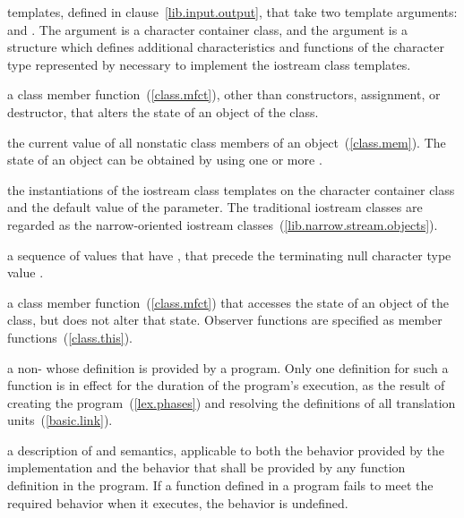 templates, defined in clause~\ref{lib.input.output},
that take two template arguments:  and .
The argument
is a character container class,
and the argument
is a structure which defines additional characteristics and functions
of the character type represented by
necessary to implement the iostream class templates.

%
a class member function~(\ref{class.mfct}), other than constructors,
assignment, or destructor,
that alters the state of an object of the class.

%
the current value of all nonstatic class members of an object~(\ref{class.mem}).
The state of an object can be obtained by using one or more
.

the instantiations of the iostream class templates on the character container
class  and the default value of the  parameter.
The traditional iostream classes are regarded as the narrow-oriented
iostream classes~(\ref{lib.narrow.stream.objects}).

%
%
a sequence of values that have
,
that precede the terminating null character type
value
.

%
a class member function~(\ref{class.mfct}) that accesses the state of an object of the class,
but does not alter that state.
Observer functions are specified as
member functions~(\ref{class.this}).

%
a non-
whose definition is provided by a \Cpp program.
Only one definition for such a function is in effect for the duration of the program's
execution, as the result of creating the program~(\ref{lex.phases}) and resolving the
definitions of all translation units~(\ref{basic.link}).

%
a description of
and
semantics,
applicable to both the behavior provided by the implementation and
the behavior that shall be provided by any function definition in the program.
If a function defined in a \Cpp program fails to meet the required
behavior when it executes, the behavior is undefined.%

